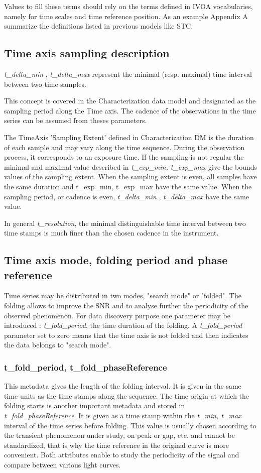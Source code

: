 \documentclass[11pt,a4paper]{ivoa}
\begin{document}
Values to fill these terms should rely on the terms defined in IVOA vocabularies, namely for  time scales and time reference position.
As an example Appendix A summarize the definitions listed in previous models like STC.

\subsection{Time axis sampling description}
\emph{t\_delta\_min }, \emph{t\_delta\_max}  represent the minimal (resp. maximal) time interval between two time samples.

This concept is covered in the Characterization data model \citep{2008ivoa.spec.0325L} and designated as the sampling period along the Time axis.
The cadence of the observations in the time series can be assumed from theses parameters.

 The TimeAxis 'Sampling Extent' defined in Characterization DM is the duration of each sample and may vary along the time sequence.
 During the observation process, it corresponds to an exposure time.
 If the sampling is not regular the minimal and maximal value described in \emph{ t\_exp\_min, t\_exp\_max} give the bounds values of the sampling extent.
When the sampling extent is even, all samples have the same duration and  t\_exp\_min, t\_exp\_max have the same value.
When the sampling period, or cadence  is even, \emph{t\_delta\_min }, \emph{t\_delta\_max} have the same value.

In general \emph{t\_resolution}, the minimal distinguishable time interval between two time stamps is  much finer than the chosen cadence in the instrument.  %

\subsection{Time axis mode, folding period  and phase reference}
Time series may be distributed in two modes, "search mode" or "folded".
The folding allows to improve the SNR and to analyse further the periodicity of the observed phenomenon.
For data discovery  purpose one parameter may be introduced : \emph{t\_fold\_period}, the time duration of the folding.
A \emph{t\_fold\_period} parameter set to zero means that the time axis is not folded  and then indicates the data belongs to "search mode".

\subsubsection{ t\_fold\_period,  t\_fold\_phaseReference}
This metadata gives the length  of the folding interval. It is given in the same time units as the time stamps along the sequence.
The time origin at which the folding starts is another important metadata and stored in
\emph{t\_fold\_phaseReference}. It is given as a time stamp within the \emph{t\_min, t\_max} interval of the time series before folding.
This value is usually chosen according to the transient phenomenon under study, on peak or gap, etc.  and cannot be standardized, that is why the time reference in the original curve is more convenient.
Both attributes enable to study the periodicity of the signal and compare between various light curves.
\end{document}
